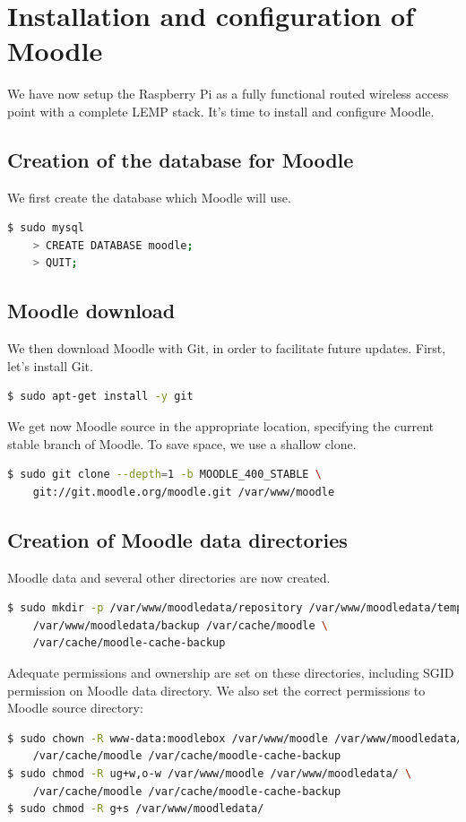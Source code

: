 \documentclass[12pt]{article}
\begin{document}
\section{Installation and configuration of Moodle}

We have now setup the Raspberry Pi as a fully functional routed wireless access point with a complete LEMP stack.
It's time to install and configure Moodle.

\subsection{Creation of the database for Moodle}

We first create the database which Moodle will use.
\begin{lstlisting}[language=bash]
$ sudo mysql
    > CREATE DATABASE moodle;
    > QUIT;
\end{lstlisting}

\subsection{Moodle download}

We then download Moodle with Git, in order to facilitate future updates.
First, let's install Git.
\begin{lstlisting}[language=bash]
$ sudo apt-get install -y git
\end{lstlisting}

We get now Moodle source in the appropriate location, specifying the current stable branch of Moodle.
To save space, we use a shallow clone.
\begin{lstlisting}[language=bash]
$ sudo git clone --depth=1 -b MOODLE_400_STABLE \
    git://git.moodle.org/moodle.git /var/www/moodle
\end{lstlisting}

\subsection{Creation of Moodle data directories}

Moodle data and several other directories are now created.
\begin{lstlisting}[language=bash]
$ sudo mkdir -p /var/www/moodledata/repository /var/www/moodledata/temp \
    /var/www/moodledata/backup /var/cache/moodle \
    /var/cache/moodle-cache-backup
\end{lstlisting}
Adequate permissions and ownership are set on these directories, including SGID permission on Moodle data directory.
We also set the correct permissions to Moodle source directory:
\begin{lstlisting}[language=bash]
$ sudo chown -R www-data:moodlebox /var/www/moodle /var/www/moodledata/ \
    /var/cache/moodle /var/cache/moodle-cache-backup
$ sudo chmod -R ug+w,o-w /var/www/moodle /var/www/moodledata/ \
    /var/cache/moodle /var/cache/moodle-cache-backup
$ sudo chmod -R g+s /var/www/moodledata/
\end{lstlisting}
\end{document}
